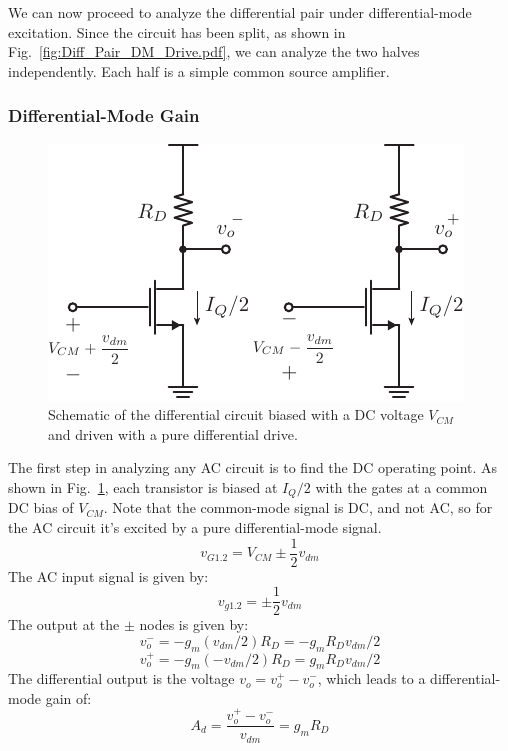 We can now proceed to analyze the differential pair under differential-mode excitation.  Since the circuit has been split, as shown in Fig.~\ref{fig:Diff_Pair_DM_Drive.pdf}, we can analyze the two halves independently.  Each half is a simple common source amplifier.
\subsubsection{Differential-Mode Gain}
\begin{figure}[tb]
\begin{center}
\includegraphics[scale=1]{Diff_ss_gain.pdf}
\end{center}
\caption{Schematic of the differential circuit biased with a DC voltage $V_{CM}$ and driven with a pure differential drive.}
\label{fig:Diff_ss_gain.pdf}
\end{figure}

The first step in analyzing any AC circuit is to find the DC operating point.  As shown in Fig.~\ref{fig:Diff_ss_gain.pdf}, each transistor is biased at $I_Q/2$ with the gates at a common DC bias of $V_{CM}$.  Note that the common-mode signal is DC, and not AC, so for the AC circuit it's excited by a pure differential-mode signal.
\begin{equation}
	{v_{G1.2}} = {V_{CM}} \pm \frac{1}{2}{v_{dm}}
\end{equation}
The AC input signal is given by:
\begin{equation}
	{v_{g1.2}} = \pm \frac{1}{2}{v_{dm}}
\end{equation}
The output at the $\pm$ nodes is given by:
\begin{equation}
	{v_{o}^-} = - {g_m}({v_{dm}}/2){R_D} =  - {g_m}{R_D}{v_{dm}}/2
\end{equation}
\begin{equation} 
	{v_{o}^+} = - {g_m}( - {v_{dm}}/2){R_D} = {g_m}{R_D}{v_{dm}}/2 
\end{equation}
The differential output is the voltage $v_o = v_o^+ - v_o^-$, which leads to a differential-mode gain of:
\begin{equation} 
	{A_d} = \frac{{{v_{o}^+} - {v_{o}^-}}}{{{v_{dm}}}} = {g_m}{R_D}
\end{equation}
